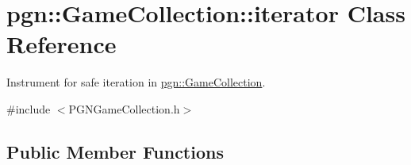 \hypertarget{classpgn_1_1GameCollection_1_1iterator}{
\section{pgn::GameCollection::iterator Class Reference}
\label{classpgn_1_1GameCollection_1_1iterator}
}


Instrument for safe iteration in \hyperlink{classpgn_1_1GameCollection}{pgn::GameCollection}.  




{\ttfamily \#include $<$PGNGameCollection.h$>$}

\subsection*{Public Member Functions}
